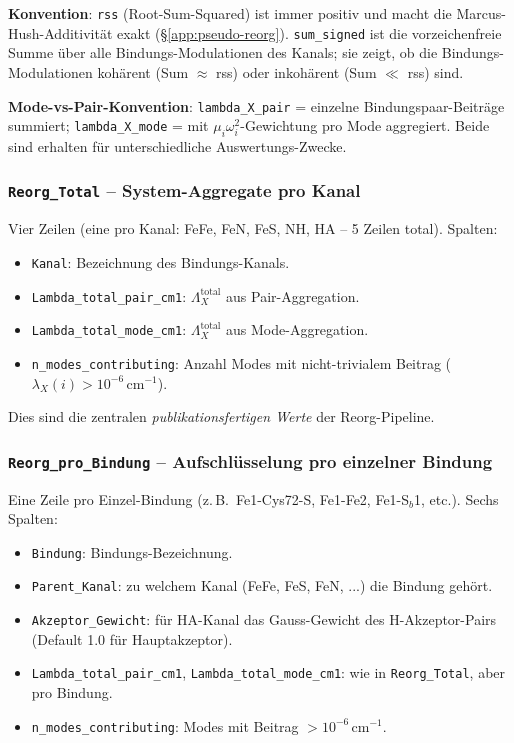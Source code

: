 \documentclass[11pt,a4paper,twoside]{article}
\theoremstyle{remark}
\begin{document}
\textbf{Konvention}: \texttt{rss} (Root-Sum-Squared) ist immer
positiv und macht die Marcus-Hush-Additivit\"at exakt
(\S\ref{app:pseudo-reorg}). \texttt{sum\_signed} ist die vorzeichenfreie
Summe \"uber alle Bindungs-Modulationen des Kanals; sie zeigt, ob
die Bindungs-Modulationen koh\"arent (Sum $\approx$ rss) oder
inkoh\"arent (Sum $\ll$ rss) sind.

\textbf{Mode-vs-Pair-Konvention}: \texttt{lambda\_X\_pair} = einzelne
Bindungspaar-Beitr\"age summiert; \texttt{lambda\_X\_mode} = mit
$\mu_i\omega_i^2$-Gewichtung pro Mode aggregiert. Beide sind
erhalten f\"ur unterschiedliche Auswertungs-Zwecke.

\subsubsection*{\texttt{Reorg\_Total} -- System-Aggregate pro Kanal}

Vier Zeilen (eine pro Kanal: FeFe, FeN, FeS, NH, HA -- 5 Zeilen
total). Spalten:

\begin{itemize}\setlength{\itemsep}{0pt}
  \item \texttt{Kanal}: Bezeichnung des Bindungs-Kanals.
  \item \texttt{Lambda\_total\_pair\_cm1}: $\Lambda_X^\text{total}$
        aus Pair-Aggregation.
  \item \texttt{Lambda\_total\_mode\_cm1}: $\Lambda_X^\text{total}$
        aus Mode-Aggregation.
  \item \texttt{n\_modes\_contributing}: Anzahl Modes mit
        nicht-trivialem Beitrag ($\lambda_X(i) > 10^{-6}$\,cm$^{-1}$).
\end{itemize}

Dies sind die zentralen \emph{publikationsfertigen Werte} der
Reorg-Pipeline.

\subsubsection*{\texttt{Reorg\_pro\_Bindung} -- Aufschl\"usselung
                  pro einzelner Bindung}

Eine Zeile pro Einzel-Bindung (z.\,B.\ Fe1-Cys72-S, Fe1-Fe2,
Fe1-S$_b$1, etc.). Sechs Spalten:

\begin{itemize}\setlength{\itemsep}{0pt}
  \item \texttt{Bindung}: Bindungs-Bezeichnung.
  \item \texttt{Parent\_Kanal}: zu welchem Kanal (FeFe, FeS, FeN, ...)
        die Bindung geh\"ort.
  \item \texttt{Akzeptor\_Gewicht}: f\"ur HA-Kanal das Gauss-Gewicht
        des H-Akzeptor-Pairs (Default 1.0 f\"ur Hauptakzeptor).
  \item \texttt{Lambda\_total\_pair\_cm1}, \texttt{Lambda\_total\_mode\_cm1}:
        wie in \texttt{Reorg\_Total}, aber pro Bindung.
  \item \texttt{n\_modes\_contributing}: Modes mit Beitrag $> 10^{-6}$\,cm$^{-1}$.
\end{itemize}
\end{document}
